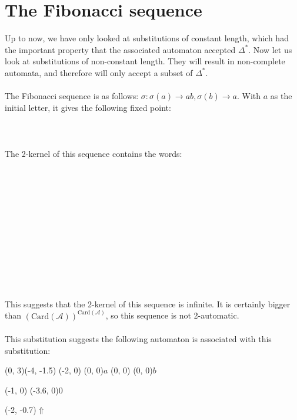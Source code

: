 \documentclass{article}
\begin{document}
\section*{The Fibonacci sequence}
Up to now, we have only looked at substitutions of constant length, which had
the important property that the associated automaton accepted
$\Delta^*$. Now let us look at substitutions of non-constant
length. They will result in non-complete automata, and therefore will only
accept a subset of $\Delta^*$.\\
\\
The Fibonacci sequence is as follows: $\sigma: \sigma(a) \rightarrow ab,
\sigma(b) \rightarrow a$. With $a$ as the initial letter, it gives the
following fixed point:\\
\\
\\
\\
The 2-kernel of this sequence contains the words:\\
\\
\\
\\
\\
\\
\\
\\
\\
\\
\\
\\
\\
This suggests that the 2-kernel of this sequence is infinite. It is certainly
bigger than $(\mathrm{Card}(\mathcal{A}))^{\mathrm{Card}(\mathcal{A})}$, so
this sequence is not 2-automatic.\\
\\
This substitution suggests the following automaton is associated with this
substitution:\\
\begin{graph}(0, 3)(-4, -1.5)
  (-2, 0) (0, 0){$a$}
  (0, 0)  (0, 0){$b$}

  (-1, 0) \freetext(-3.6, 0){0}
   
   

  \freetext(-2, -0.7){$\Uparrow$}
\end{graph}\\
\end{document}
